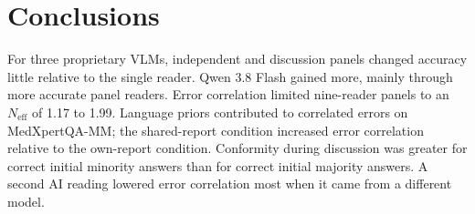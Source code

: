 \section{Conclusions}

For three proprietary VLMs, independent and discussion panels changed accuracy little relative to the single reader. Qwen 3.8 Flash gained more, mainly through more accurate panel readers. Error correlation limited nine-reader panels to an $N_{\mathrm{eff}}$ of 1.17 to 1.99. Language priors contributed to correlated errors on MedXpertQA-MM; the shared-report condition increased error correlation relative to the own-report condition. Conformity during discussion was greater for correct initial minority answers than for correct initial majority answers. A second AI reading lowered error correlation most when it came from a different model.
